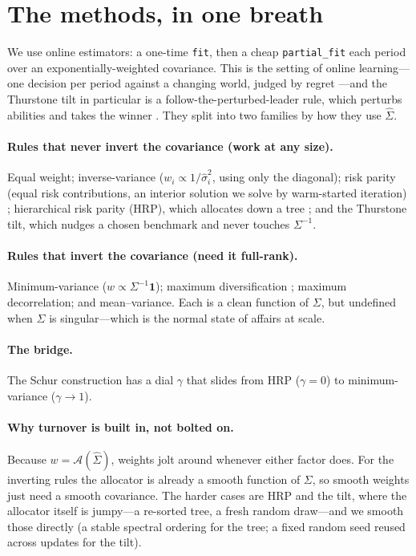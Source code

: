 \documentclass[11pt]{article}
\newcommand{\Sig}{\Sigma}
\begin{document}
\section{The methods, in one breath}
We use online estimators: a one-time \texttt{fit}, then a cheap
\texttt{partial\_fit} each period over an exponentially-weighted covariance. This
is the setting of online learning---one decision per period against a changing
world, judged by regret \parencite{cover1991, hazan2016}---and the Thurstone tilt
in particular is a follow-the-perturbed-leader rule, which perturbs abilities and
takes the winner \parencite{hannan1957, kalaivempala2005}. They
split into two families by how they use $\widehat{\Sig}$.

\paragraph{Rules that never invert the covariance (work at any size).}
Equal weight; inverse-variance ($w_i \propto 1/\widehat\sigma_i^2$,
using only the diagonal); risk parity (equal risk contributions, an
interior solution we solve by warm-started iteration)
\parencite{maillard2010}; hierarchical risk parity (HRP), which allocates
down a tree \parencite{lopezdeprado2016}; and the Thurstone tilt, which
nudges a chosen benchmark and never touches $\Sig^{-1}$.

\paragraph{Rules that invert the covariance (need it full-rank).}
Minimum-variance ($w\propto\Sig^{-1}\mathbf 1$); maximum
diversification \parencite{choueifaty2008}; maximum decorrelation; and
mean--variance. Each is a clean function of $\Sig$, but undefined when
$\Sig$ is singular---which is the normal state of affairs at scale.

\paragraph{The bridge.}
The Schur construction \parencite{cotton2024schur} has a dial $\gamma$ that slides
from HRP ($\gamma{=}0$) to minimum-variance ($\gamma{\to}1$).

\paragraph{Why turnover is built in, not bolted on.}
Because $w=\mathcal{A}(\widehat\Sig)$, weights jolt around whenever either
factor does. For the inverting rules the allocator is already a smooth function of
$\Sig$, so smooth weights just need a smooth covariance. The harder cases are HRP
and the tilt, where the allocator itself is jumpy---a re-sorted tree, a fresh
random draw---and we smooth those directly (a stable spectral ordering for the
tree; a fixed random seed reused across updates for the tilt).
\end{document}
